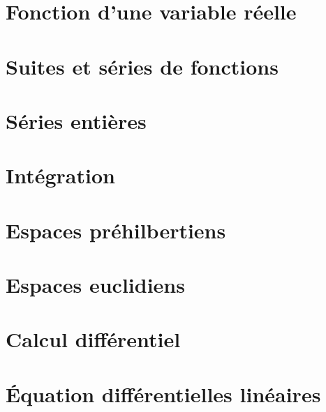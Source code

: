 \documentclass[12pt]{article}
\theoremstyle{remark}
\theoremstyle{remark}
\begin{document}
\cleardoublepage
\section{Fonction d'une variable réelle}
\cleardoublepage
\section{Suites et séries de fonctions}
\cleardoublepage
\section{Séries entières}
\cleardoublepage
\section{Intégration}
\cleardoublepage
\section{Espaces préhilbertiens}
\cleardoublepage
\section{Espaces euclidiens}
\cleardoublepage
\section{Calcul différentiel}
\cleardoublepage
\section{\'Equation différentielles linéaires}
\end{document}
